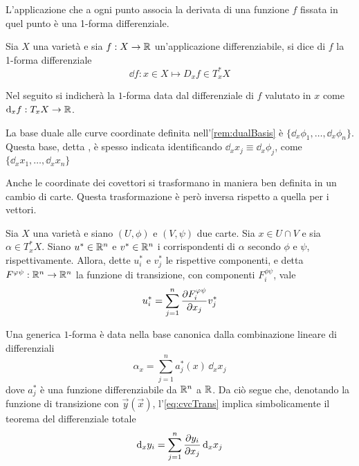 L'applicazione che a ogni punto associa la derivata di una funzione $f$ fissata in quel punto è una 1-forma differenziale.
\begin{definition} \label{def:differential}
  Sia $X$ una varietà e sia $f:X\to \mathbb{R}$ un'applicazione differenziabile, si dice  di $f$ la 1-forma differenziale \begin{equation}
  \dd f: x \in X \mapsto D_x f \in T_x^* X
  \end{equation} 
\end{definition}
\begin{remark}
  Nel seguito si indicherà la $1$-forma data dal differenziale di $f$ valutato in $x$ come $\dd_x f:T_x X \to \mathbb{R}$.
\end{remark}
\begin{remark}
  La base duale alle curve coordinate definita nell'\autoref{rem:dualBasis} è $\{ \dd_x{\phi_1}, \ldots, \dd_x{\phi_n}\}$. Questa base, detta , è spesso indicata identificando $\dd_x{x_j} \equiv \dd_x{\phi_j}$, come $\{ \dd_x x_1, \ldots, \dd_x x_n\}$ 
\end{remark}
Anche le coordinate dei covettori si trasformano in maniera ben definita in un cambio di carte. Questa trasformazione è però inversa rispetto a quella per i vettori.

\begin{theorem} 
  Sia $X$ una varietà e siano $(U,\phi)$ e $(V,\psi)$ due carte. Sia $x \in  U \cap V$ e sia $\alpha \in  T_x^* X$. Siano $u^* \in \mathbb{R}^{n}$ e $v^* \in  \mathbb{R}^{n}$ i corrispondenti di $\alpha$ secondo $\phi$ e $\psi$, rispettivamente. Allora, dette $u^*_i$ e $v^*_j$ le rispettive componenti, e detta $F^{\varphi\psi}:\mathbb{R}^{n} \to \mathbb{R}^{n}$ la funzione di transizione, con componenti $F^{\phi \psi}_i$, vale \begin{equation} \label{eq:cvcTrans}
  u^*_i = \sum_{j=1}^n \pdv{F^{\varphi\psi}_i}{x_j} v^*_j
  \end{equation} 
\end{theorem}

Una generica $1$-forma è data nella base canonica dalla combinazione lineare di differenziali \begin{equation*}
\alpha_x = \sum_{j=1}^{n} a^*_j(x)\, \dd_x x_j
\end{equation*} 
dove $a_j^*$ è una funzione differenziabile da $\mathbb{R}^{n}$ a $\mathbb{R}$. Da ciò segue che, denotando la funzione di transizione con $\vec{y}(\vec{x})$, l'\autoref{eq:cvcTrans} implica simbolicamente il teorema del differenziale totale \begin{equation*}
\dd_x y_i = \sum_{j=1}^{n} \pdv{y_i}{x_j}\, \dd_x x_j
\end{equation*} 

